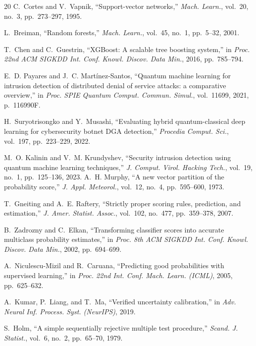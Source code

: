 \documentclass[journal]{IEEEtran}
\begin{document}
\begin{thebibliography}{20}
C.~Cortes and V.~Vapnik, ``Support-vector networks,''
\emph{Mach. Learn.}, vol.~20, no.~3, pp.~273--297, 1995.

L.~Breiman, ``Random forests,'' \emph{Mach. Learn.}, vol.~45, no.~1,
pp.~5--32, 2001.

T.~Chen and C.~Guestrin,
``XGBoost: A scalable tree boosting system,'' in
\emph{Proc. 22nd ACM SIGKDD Int. Conf. Knowl. Discov. Data Min.},
2016, pp.~785--794.

E.~D. Payares and J.~C. Mart\'inez-Santos,
``Quantum machine learning for intrusion detection of distributed
  denial of service attacks: a comparative overview,'' in
\emph{Proc. SPIE Quantum Comput. Commun. Simul.}, vol.~11699, 2021,
p.~116990F.

H.~Suryotrisongko and Y.~Musashi,
``Evaluating hybrid quantum-classical deep learning for cybersecurity
  botnet DGA detection,'' \emph{Procedia Comput. Sci.}, vol.~197,
pp.~223--229, 2022.

M.~O. Kalinin and V.~M. Krundyshev,
``Security intrusion detection using quantum machine learning
  techniques,'' \emph{J. Comput. Virol. Hacking Tech.}, vol.~19,
no.~1, pp.~125--136, 2023.
A.~H. Murphy, ``A new vector partition of the probability score,''
\emph{J. Appl. Meteorol.}, vol.~12, no.~4, pp.~595--600, 1973.

T.~Gneiting and A.~E. Raftery, ``Strictly proper scoring rules, prediction,
and estimation,'' \emph{J. Amer. Statist. Assoc.}, vol.~102, no.~477,
pp.~359--378, 2007.

B.~Zadrozny and C.~Elkan, ``Transforming classifier scores into accurate
multiclass probability estimates,'' in \emph{Proc. 8th ACM SIGKDD Int.
Conf. Knowl. Discov. Data Min.}, 2002, pp.~694--699.

A.~Niculescu-Mizil and R.~Caruana, ``Predicting good probabilities with
supervised learning,'' in \emph{Proc. 22nd Int. Conf. Mach. Learn.
(ICML)}, 2005, pp.~625--632.

A.~Kumar, P.~Liang, and T.~Ma, ``Verified uncertainty calibration,'' in
\emph{Adv. Neural Inf. Process. Syst. (NeurIPS)}, 2019.

S.~Holm, ``A simple sequentially rejective multiple test procedure,''
\emph{Scand. J. Statist.}, vol.~6, no.~2, pp.~65--70, 1979.


\end{thebibliography}
\end{document}
